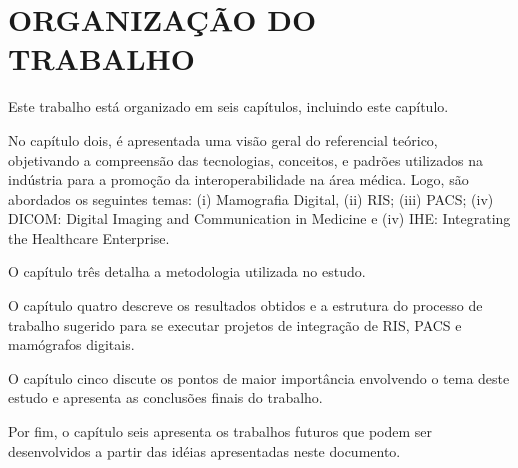 \section[ORGANIZAÇÃO DO TRABALHO]{ORGANIZAÇÃO DO TRABALHO}
Este trabalho está organizado em seis capítulos, incluindo este capítulo.

No capítulo dois, é apresentada uma visão geral do referencial teórico, objetivando a
compreensão das tecnologias, conceitos, e padrões utilizados na indústria para a promoção
da interoperabilidade na área médica. Logo, são abordados os seguintes temas: (i)
Mamografia Digital, (ii) RIS; (iii) PACS; (iv) DICOM: Digital Imaging and
Communication in Medicine e (iv) IHE: Integrating the Healthcare Enterprise.

O capítulo três detalha a metodologia utilizada no estudo.

O capítulo quatro descreve os resultados obtidos e a estrutura do processo de trabalho
sugerido para se executar projetos de integração de RIS, PACS e mamógrafos digitais.

O capítulo cinco discute os pontos de maior importância envolvendo o tema deste
estudo e apresenta as conclusões finais do trabalho.

Por fim, o capítulo seis apresenta os trabalhos futuros que podem ser desenvolvidos a
partir das idéias apresentadas neste documento.